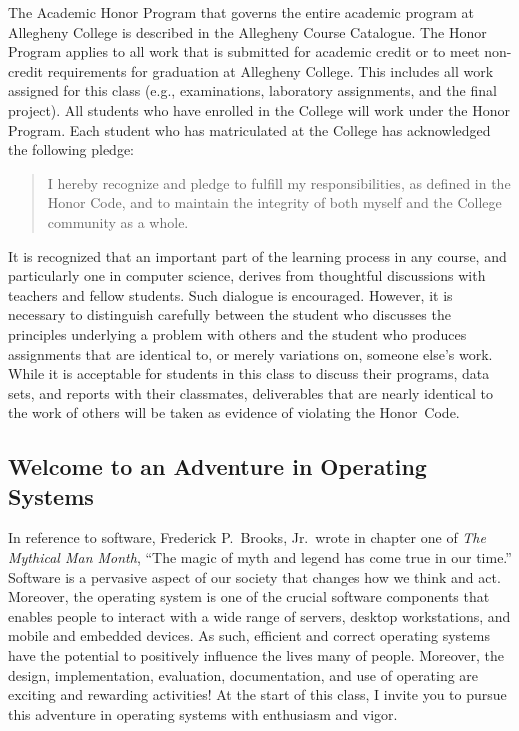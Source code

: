 The Academic Honor Program that governs the entire academic program at Allegheny College is described in the Allegheny
Course Catalogue.  The Honor Program applies to all work that is submitted for academic credit or to meet non-credit
requirements for graduation at Allegheny College.  This includes all work assigned for this class (e.g., examinations,
laboratory assignments, and the final project).  All students who have enrolled in the College will work under the Honor
Program.  Each student who has matriculated at the College has acknowledged the following pledge:

\vspace*{-.1in}
\begin{quote}
I hereby recognize and pledge to fulfill my responsibilities, as defined in the Honor Code, and to maintain the
integrity of both myself and the College community as a whole.
\end{quote}
\vspace*{-.15in}

\noindent It is recognized that an important part of the learning process in any course, and particularly one in
computer science, derives from thoughtful discussions with teachers and fellow students.  Such dialogue is encouraged.
However, it is necessary to distinguish carefully between the student who discusses the principles underlying a problem
with others and the student who produces assignments that are identical to, or merely variations on, someone else's
work.  While it is acceptable for students in this class to discuss their programs, data sets, and reports with their
classmates, deliverables that are nearly identical to the work of others will be taken as evidence of violating the
\mbox{Honor Code}.

\subsection*{Welcome to an Adventure in Operating Systems}

In reference to software, Frederick P.\ Brooks, Jr.\ wrote in chapter one of {\em The Mythical Man Month}, ``The magic
of myth and legend has come true in our time.'' Software is a pervasive aspect of our society that changes how we think
and act. Moreover, the operating system is one of the crucial software components that enables people to interact with a
wide range of servers, desktop workstations, and mobile and embedded devices.  As such, efficient and correct operating
systems have the potential to positively influence the lives many of people.  Moreover, the design, implementation,
evaluation, documentation, and use of operating are exciting and rewarding activities!  At the start of this class, I
invite you to pursue this adventure in operating systems with enthusiasm and vigor.


